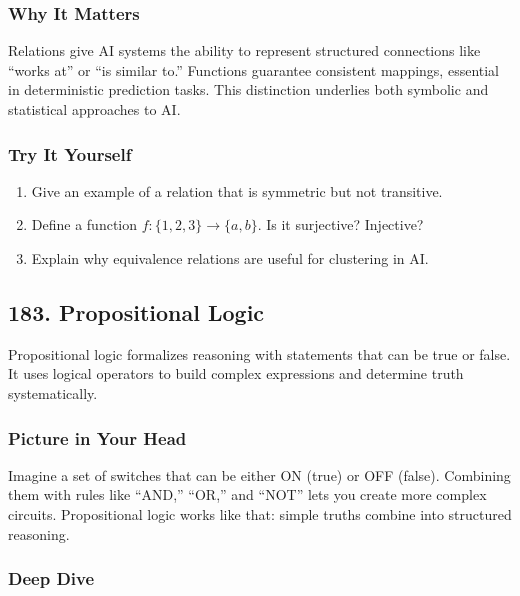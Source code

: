 \documentclass[
  letterpaper,
  DIV=11,
  numbers=noendperiod]{scrreprt}
\providecommand{\tightlist}{%
  \setlength{\itemsep}{0pt}\setlength{\parskip}{0pt}}
\begin{document}
\subsubsection{Why It Matters}\label{why-it-matters-79}

Relations give AI systems the ability to represent structured
connections like ``works at'' or ``is similar to.'' Functions guarantee
consistent mappings, essential in deterministic prediction tasks. This
distinction underlies both symbolic and statistical approaches to AI.

\subsubsection{Try It Yourself}\label{try-it-yourself-181}

\begin{enumerate}
\def\labelenumi{\arabic{enumi}.}
\tightlist
\item
  Give an example of a relation that is symmetric but not transitive.
\item
  Define a function \(f: \{1,2,3\} \to \{a,b\}\). Is it surjective?
  Injective?
\item
  Explain why equivalence relations are useful for clustering in AI.
\end{enumerate}

\subsection{183. Propositional Logic}\label{propositional-logic}

Propositional logic formalizes reasoning with statements that can be
true or false. It uses logical operators to build complex expressions
and determine truth systematically.

\subsubsection{Picture in Your Head}\label{picture-in-your-head-182}

Imagine a set of switches that can be either ON (true) or OFF (false).
Combining them with rules like ``AND,'' ``OR,'' and ``NOT'' lets you
create more complex circuits. Propositional logic works like that:
simple truths combine into structured reasoning.

\subsubsection{Deep Dive}\label{deep-dive-182}
\end{document}
